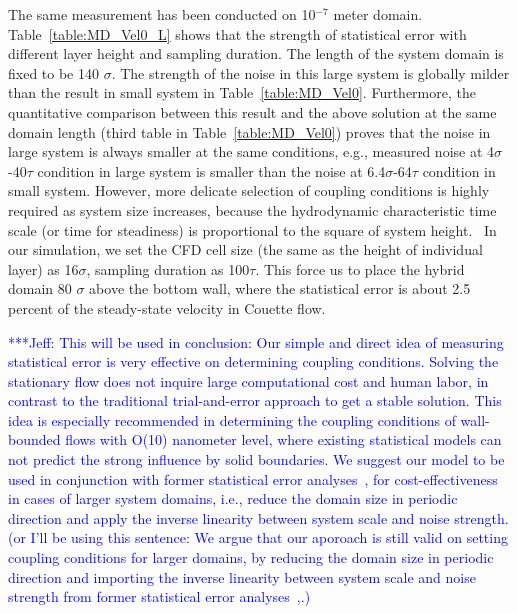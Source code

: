 \documentclass[preprint,12pt]{elsarticle}
\newcommand{\skonote}[1]{ {\textcolor{blue} { ***Jeff: #1 }}}
\newcommand{\skonote}[1]{}
\begin{document}
The same measurement has been conducted on 10$^{-7}$ meter domain. Table~\ref{table:MD_Vel0_L} shows that the strength of statistical error with different layer height and sampling duration. The length of the system domain is fixed to be 140 $\sigma$.
The strength of the noise in this large system is globally milder than the result in small system in Table~\ref{table:MD_Vel0}. Furthermore, the quantitative comparison between this result and the above solution at the same domain length (third table in Table~\ref{table:MD_Vel0}) proves that the noise in large system is always smaller at the same conditions, e.g., measured noise at 4$\sigma$-40$\tau$ condition in large system is smaller than the noise at 6.4$\sigma$-64$\tau$ condition in small system. However, more delicate selection of coupling conditions is highly required as system size increases, because the hydrodynamic characteristic time scale (or time for steadiness) is proportional to the square of system height.~\cite{Hadjicon2} In our simulation, we set the CFD cell size (the same as the height of individual layer) as 16$\sigma$, sampling duration as 100$\tau$. This force us to place the hybrid domain 80 $\sigma$ above the bottom wall, where the statistical error is about 2.5 percent of the steady-state velocity in Couette flow.

\skonote{This will be used in conclusion: Our simple and direct idea of measuring statistical error is very effective on determining coupling conditions. Solving the stationary flow does not inquire large computational cost and human labor, in contrast to the traditional trial-and-error approach to get a stable solution. This idea is especially recommended in determining the coupling conditions of wall-bounded flows with O(10) nanometer level, where existing statistical models can not predict the strong influence by solid boundaries. We suggest our model to be used in conjunction with former statistical error analyses~\cite{Hadjicon2},\cite{Time_Mechanism} for cost-effectiveness in cases of larger system domains, i.e., reduce the domain size in periodic direction and apply the inverse linearity between system scale and noise strength. (or I'll be using this sentence: We argue that our aporoach is still valid on setting coupling conditions for larger domains, by reducing the domain size in periodic direction and importing the inverse linearity between system scale and noise strength from former statistical error analyses~\cite{Hadjicon2},\cite{Time_Mechanism}.)
}
\end{document}
